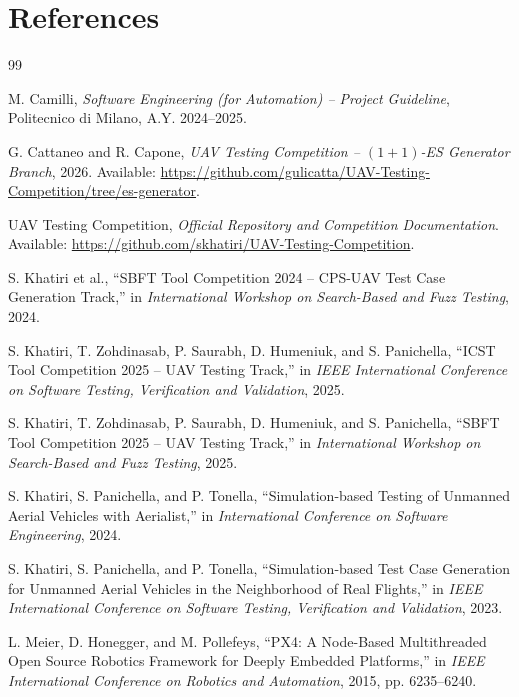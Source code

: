\documentclass[11pt,a4paper]{report}
\begin{document}
\chapter{References}
\label{chap:references}

\begin{thebibliography}{99}

M. Camilli, \emph{Software Engineering (for Automation) -- Project Guideline}, Politecnico di Milano, A.Y. 2024--2025.

G. Cattaneo and R. Capone, \emph{UAV Testing Competition -- $(1+1)$-ES Generator Branch}, 2026. Available: \url{https://github.com/gulicatta/UAV-Testing-Competition/tree/es-generator}.

UAV Testing Competition, \emph{Official Repository and Competition Documentation}. Available: \url{https://github.com/skhatiri/UAV-Testing-Competition}.

S. Khatiri et al., ``SBFT Tool Competition 2024 -- CPS-UAV Test Case Generation Track,'' in \emph{International Workshop on Search-Based and Fuzz Testing}, 2024.

S. Khatiri, T. Zohdinasab, P. Saurabh, D. Humeniuk, and S. Panichella, ``ICST Tool Competition 2025 -- UAV Testing Track,'' in \emph{IEEE International Conference on Software Testing, Verification and Validation}, 2025.

S. Khatiri, T. Zohdinasab, P. Saurabh, D. Humeniuk, and S. Panichella, ``SBFT Tool Competition 2025 -- UAV Testing Track,'' in \emph{International Workshop on Search-Based and Fuzz Testing}, 2025.

S. Khatiri, S. Panichella, and P. Tonella, ``Simulation-based Testing of Unmanned Aerial Vehicles with Aerialist,'' in \emph{International Conference on Software Engineering}, 2024.

S. Khatiri, S. Panichella, and P. Tonella, ``Simulation-based Test Case Generation for Unmanned Aerial Vehicles in the Neighborhood of Real Flights,'' in \emph{IEEE International Conference on Software Testing, Verification and Validation}, 2023.

L. Meier, D. Honegger, and M. Pollefeys, ``PX4: A Node-Based Multithreaded Open Source Robotics Framework for Deeply Embedded Platforms,'' in \emph{IEEE International Conference on Robotics and Automation}, 2015, pp. 6235--6240.



\end{thebibliography}
\end{document}
